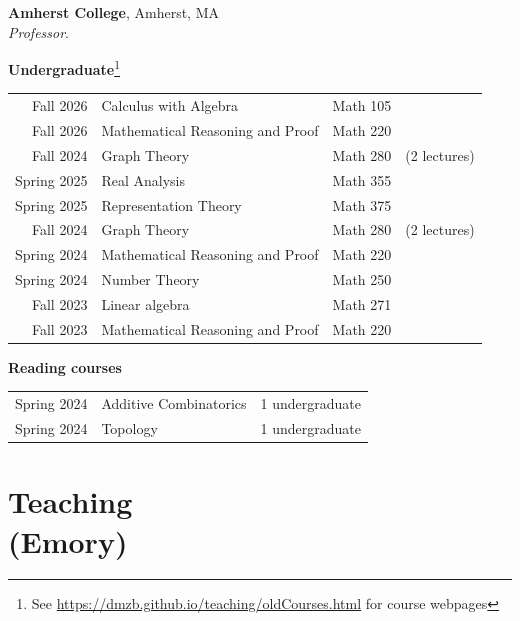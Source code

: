 \documentclass[margin,line]{res}
\newcommand{\defi}[1]{\textsf{#1}} 				%
\begin{document}
\begin{resume}
{\bf Amherst College}, Amherst, MA\\
\emph{Professor}. 
\vspace{2pt}




{\bf Undergraduate}\footnote{See \url{https://dmzb.github.io/teaching/oldCourses.html} for course webpages}
\vspace*{-.1in}

\begin{tabular}{rlll}
 Fall 2026 & \defi{Calculus with Algebra} & Math 105\\  
 Fall 2026 & \defi{Mathematical Reasoning and Proof} & Math 220\\  
 Fall 2024 & \defi{Graph Theory} & Math 280& (2 lectures)\\      
 Spring 2025 & \defi{Real Analysis} & Math 355\\  
 Spring 2025 & \defi{Representation Theory} & Math 375\\  
 Fall 2024 & \defi{Graph Theory} & Math 280& (2 lectures)\\    
 Spring 2024 & \defi{Mathematical Reasoning and Proof} & Math 220&\\  
 Spring 2024 & \defi{Number Theory} & Math 250&\\  
 Fall 2023 & \defi{Linear algebra} & Math 271&\\  
 Fall 2023 & \defi{Mathematical Reasoning and Proof} & Math 220&\\  
\end{tabular}

{\bf Reading courses} 
\vspace*{-.1in}

\begin{tabular}{rll}  
Spring 2024 &\defi{Additive Combinatorics}  & 1 undergraduate            \\
Spring 2024 &\defi{Topology}  & 1 undergraduate\\
\end{tabular}

\vspace{-7pt}
\section{\sc Teaching \\ (Emory)}


\end{resume}
\end{document}
